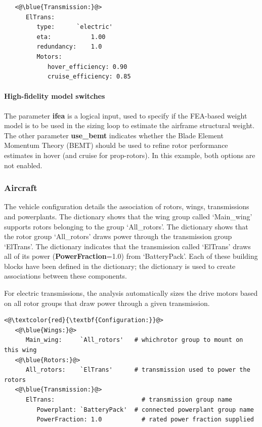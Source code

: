 \begin{lstlisting}
   <@\blue{Transmission:}@>
      ElTrans: 
         type:      `electric'
         eta:           1.00
         redundancy:    1.0   
         Motors:
            hover_efficiency: 0.90
            cruise_efficiency: 0.85
\end{lstlisting}

\paragraph{High-fidelity model switches}
The parameter \textbf{ifea} is a logical input, used to specify if the FEA-based weight model is to be used in the sizing loop to estimate the airframe structural weight. The other parameter \textbf{use\_bemt} indicates whether the Blade Element Momentum Theory (BEMT) should be used to refine rotor performance estimates in hover (and cruise for prop-rotors). In this example, both options are not enabled. 

\subsubsection{Aircraft }
The vehicle configuration details the association of rotors, wings, transmissions and powerplants. The  dictionary shows that the wing group called `Main\_wing' supports rotors belonging to the group `All\_rotors'. The  dictionary shows that the rotor group `All\_rotors' draws power through the transmission group `ElTrans'. The  dictionary indicates that the transmission called `ElTrans' draws all of its power (\textbf{PowerFraction}=1.0) from `BatteryPack'. Each of these building blocks have been defined in the  dictionary; the  dictionary is used to create associations between these components. 

For electric transmissions, the analysis automatically sizes the drive motors based on all rotor groups that draw power through a given transmission.

\begin{lstlisting}
<@\textcolor{red}{\textbf{Configuration:}}@>
   <@\blue{Wings:}@>
      Main_wing:     `All_rotors'   # whichrotor group to mount on this wing 
   <@\blue{Rotors:}@>
      All_rotors:    `ElTrans'      # transmission used to power the rotors
   <@\blue{Transmission:}@>                   
      ElTrans:                        # transmission group name 
         Powerplant: `BatteryPack'  # connected powerplant group name
         PowerFraction: 1.0           # rated power fraction supplied 
\end{lstlisting}

